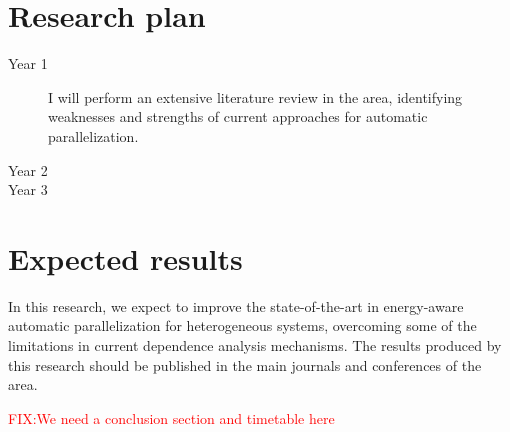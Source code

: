 \documentclass[a4paper,12pt]{article}
\newcommand\FIXME[1]{\textcolor{red}{FIX:}\textcolor{red}{#1}}
\begin{document}
\section{Research plan}

\begin{description}
\item[Year 1] I will perform an extensive literature review in the area, identifying
weaknesses and strengths of current approaches for automatic parallelization.

\item[Year 2] 
\item[Year 3] 
\end{description}

\section{Expected results}

In this research, we expect
to improve the state-of-the-art in energy-aware automatic parallelization
for heterogeneous systems, overcoming some of the limitations in current dependence analysis mechanisms.
The results produced by this research should be published in the main journals and conferences
of the area.

\FIXME{We need a conclusion section and timetable here}



\end{document}
